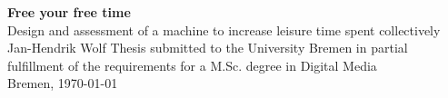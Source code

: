 \documentclass[12pt,numbers=noenddot,parskip,bibliography=totocnumbered,listof=totocnumbered,draft]{scrreprt}
\begin{document}
\begin{titlepage}
\null
\vfill

\Huge\textbf{Free your free time}
\bigskip\\
\LARGE{Design and assessment of a machine to increase leisure time spent collectively} %
\medskip\\
\Large{Jan-Hendrik Wolf}
\vfill
\vfill
\vfill
\small{Thesis submitted to the University Bremen in partial fulfillment of the requirements for a M.Sc. degree in Digital Media\\
Bremen, \today}
\end{titlepage}


\tableofcontents
\end{document}
